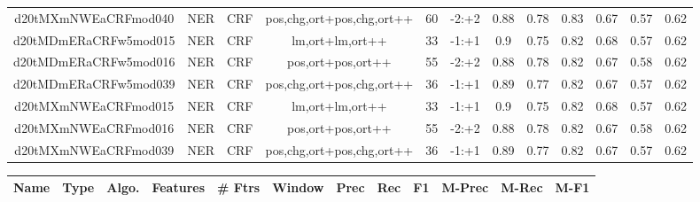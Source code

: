 \documentclass[a4paper]{article}
\begin{document}
\begin{landscape}
\begin{center}
\begin{tabular}{ |c|c|c|c|c|c|c|c|c|c|c|c|}
 
 	
 	\small{ d20tMXmNWEaCRFmod040 } & \small{ NER} & \small{  CRF }  & pos,chg,ort+pos,chg,ort++  &  60 &  \small{  -2:+2 }  &  0.88 & 0.78 & 0.83  &  0.67 & 0.57 & 0.62 \\
 	

 
 	
 	\small{ d20tMDmERaCRFw5mod015 } & \small{ NER} & \small{  CRF }  & lm,ort+lm,ort++  &  33 &  \small{  -1:+1 }  &  0.9 & 0.75 & 0.82  &  0.68 & 0.57 & 0.62 \\
 	

 
 	
 	\small{ d20tMDmERaCRFw5mod016 } & \small{ NER} & \small{  CRF }  & pos,ort+pos,ort++  &  55 &  \small{  -2:+2 }  &  0.88 & 0.78 & 0.82  &  0.67 & 0.58 & 0.62 \\
 	

 
 	
 	\small{ d20tMDmERaCRFw5mod039 } & \small{ NER} & \small{  CRF }  & pos,chg,ort+pos,chg,ort++  &  36 &  \small{  -1:+1 }  &  0.89 & 0.77 & 0.82  &  0.67 & 0.57 & 0.62 \\
 	

 
 	
 	\small{ d20tMXmNWEaCRFmod015 } & \small{ NER} & \small{  CRF }  & lm,ort+lm,ort++  &  33 &  \small{  -1:+1 }  &  0.9 & 0.75 & 0.82  &  0.68 & 0.57 & 0.62 \\
 	

 
 	
 	\small{ d20tMXmNWEaCRFmod016 } & \small{ NER} & \small{  CRF }  & pos,ort+pos,ort++  &  55 &  \small{  -2:+2 }  &  0.88 & 0.78 & 0.82  &  0.67 & 0.58 & 0.62 \\
 	

 
 	
 	\small{ d20tMXmNWEaCRFmod039 } & \small{ NER} & \small{  CRF }  & pos,chg,ort+pos,chg,ort++  &  36 &  \small{  -1:+1 }  &  0.89 & 0.77 & 0.82  &  0.67 & 0.57 & 0.62 \\
 	
 \hline
\end{tabular}
\end{center}




\begin{center}
\begin{tabular}{ |c|c|c|c|c|c|c|c|c|c|c|c|} 
 \hline
 	Name & Type & Algo. & Features & \# Ftrs & Window & Prec & Rec & F1 & M-Prec & M-Rec & M-F1\\
 \hline

 	

 
 	

\end{tabular}
\end{center}
\end{landscape}
\end{document}
